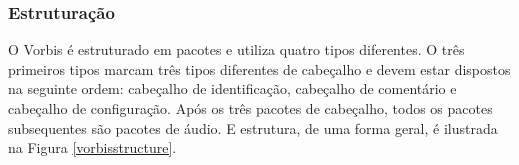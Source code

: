 

\subsubsection{Estruturação}

O Vorbis é estruturado em pacotes e utiliza quatro tipos diferentes. O três primeiros tipos marcam três tipos diferentes de cabeçalho e devem estar dispostos na seguinte ordem: cabeçalho de identificação, cabeçalho de comentário e cabeçalho de configuração. Após os três pacotes de cabeçalho, todos os pacotes subsequentes são pacotes de áudio. E estrutura, de uma forma geral, é ilustrada na Figura \ref{vorbisstructure}.

